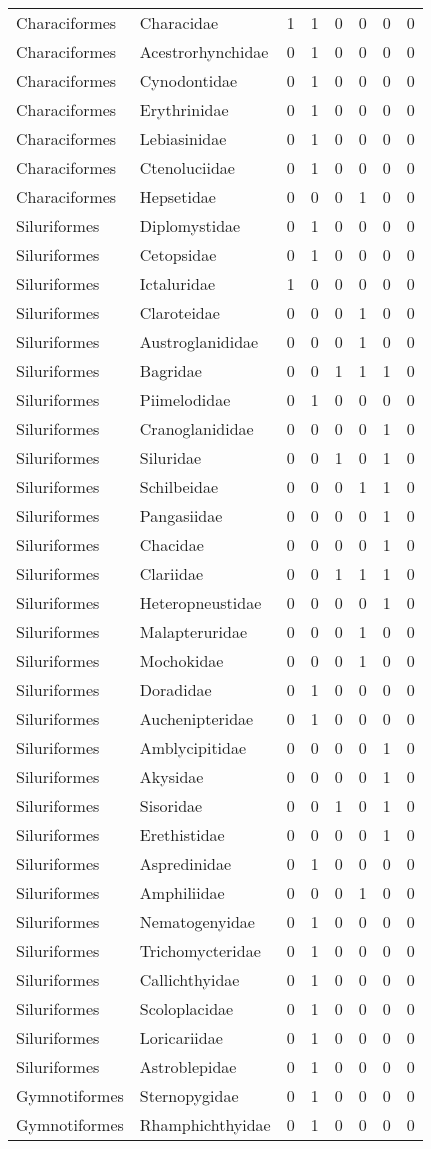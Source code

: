 \documentclass[11pt]{article}
\begin{document}
\begin{longtable}[l]{@{}llrrrrrr@{}}
Characiformes & Characidae & 1 & 1 & 0 & 0 & 0 & 0\tabularnewline
Characiformes & Acestrorhynchidae & 0 & 1 & 0 & 0 & 0 & 0\tabularnewline
Characiformes & Cynodontidae & 0 & 1 & 0 & 0 & 0 & 0\tabularnewline
Characiformes & Erythrinidae & 0 & 1 & 0 & 0 & 0 & 0\tabularnewline
Characiformes & Lebiasinidae & 0 & 1 & 0 & 0 & 0 & 0\tabularnewline
Characiformes & Ctenoluciidae & 0 & 1 & 0 & 0 & 0 & 0\tabularnewline
Characiformes & Hepsetidae & 0 & 0 & 0 & 1 & 0 & 0\tabularnewline
Siluriformes & Diplomystidae & 0 & 1 & 0 & 0 & 0 & 0\tabularnewline
Siluriformes & Cetopsidae & 0 & 1 & 0 & 0 & 0 & 0\tabularnewline
Siluriformes & Ictaluridae & 1 & 0 & 0 & 0 & 0 & 0\tabularnewline
Siluriformes & Claroteidae & 0 & 0 & 0 & 1 & 0 & 0\tabularnewline
Siluriformes & Austroglanididae & 0 & 0 & 0 & 1 & 0 & 0\tabularnewline
Siluriformes & Bagridae & 0 & 0 & 1 & 1 & 1 & 0\tabularnewline
Siluriformes & Piimelodidae & 0 & 1 & 0 & 0 & 0 & 0\tabularnewline
Siluriformes & Cranoglanididae & 0 & 0 & 0 & 0 & 1 & 0\tabularnewline
Siluriformes & Siluridae & 0 & 0 & 1 & 0 & 1 & 0\tabularnewline
Siluriformes & Schilbeidae & 0 & 0 & 0 & 1 & 1 & 0\tabularnewline
Siluriformes & Pangasiidae & 0 & 0 & 0 & 0 & 1 & 0\tabularnewline
Siluriformes & Chacidae & 0 & 0 & 0 & 0 & 1 & 0\tabularnewline
Siluriformes & Clariidae & 0 & 0 & 1 & 1 & 1 & 0\tabularnewline
Siluriformes & Heteropneustidae & 0 & 0 & 0 & 0 & 1 & 0\tabularnewline
Siluriformes & Malapteruridae & 0 & 0 & 0 & 1 & 0 & 0\tabularnewline
Siluriformes & Mochokidae & 0 & 0 & 0 & 1 & 0 & 0\tabularnewline
Siluriformes & Doradidae & 0 & 1 & 0 & 0 & 0 & 0\tabularnewline
Siluriformes & Auchenipteridae & 0 & 1 & 0 & 0 & 0 & 0\tabularnewline
Siluriformes & Amblycipitidae & 0 & 0 & 0 & 0 & 1 & 0\tabularnewline
Siluriformes & Akysidae & 0 & 0 & 0 & 0 & 1 & 0\tabularnewline
Siluriformes & Sisoridae & 0 & 0 & 1 & 0 & 1 & 0\tabularnewline
Siluriformes & Erethistidae & 0 & 0 & 0 & 0 & 1 & 0\tabularnewline
Siluriformes & Aspredinidae & 0 & 1 & 0 & 0 & 0 & 0\tabularnewline
Siluriformes & Amphiliidae & 0 & 0 & 0 & 1 & 0 & 0\tabularnewline
Siluriformes & Nematogenyidae & 0 & 1 & 0 & 0 & 0 & 0\tabularnewline
Siluriformes & Trichomycteridae & 0 & 1 & 0 & 0 & 0 & 0\tabularnewline
Siluriformes & Callichthyidae & 0 & 1 & 0 & 0 & 0 & 0\tabularnewline
Siluriformes & Scoloplacidae & 0 & 1 & 0 & 0 & 0 & 0\tabularnewline
Siluriformes & Loricariidae & 0 & 1 & 0 & 0 & 0 & 0\tabularnewline
Siluriformes & Astroblepidae & 0 & 1 & 0 & 0 & 0 & 0\tabularnewline
Gymnotiformes & Sternopygidae & 0 & 1 & 0 & 0 & 0 & 0\tabularnewline
Gymnotiformes & Rhamphichthyidae & 0 & 1 & 0 & 0 & 0 & 0\tabularnewline

\end{longtable}
\end{document}
